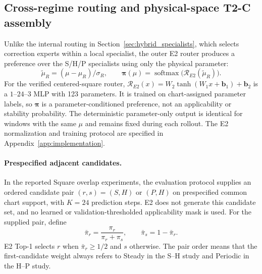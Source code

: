 \subsection{Cross-regime routing and physical-space T2-C assembly}
\label{sec:outer_routing}

Unlike the internal routing in Section~\ref{sec:hybrid_specialists},
which selects correction experts within a local specialist, the outer
E2 router produces a preference over the S/H/P specialists using only
the physical parameter:
\begin{equation}
  \widetilde\mu_R=(\mu-\mu_R)/\sigma_R,\qquad
  \bm\pi(\mu)=\operatorname{softmax}
  \bigl(\mathcal R_{E2}(\widetilde\mu_R)\bigr).
  \label{eq:main_e2_preference}
\end{equation}
For the verified centered-square router,
$\mathcal R_{E2}(x)=W_2\tanh(W_1x+\bm b_1)+\bm b_2$
is a $1$--$24$--$3$ MLP with 123 parameters.
It is trained on chart-assigned parameter labels, so $\bm\pi$ is a
parameter-conditioned preference, not an applicability or stability
probability. The deterministic parameter-only output is identical
for windows with the same $\mu$ and remains fixed during each rollout.
The E2 normalization and training protocol are specified in
Appendix~\ref{app:implementation}.

\paragraph{Prespecified adjacent candidates.}
In the reported Square overlap experiments, the evaluation protocol
supplies an ordered candidate pair $(r,s)=(S,H)$ or $(P,H)$ on
prespecified common chart support, with $K=24$ prediction steps.
E2 does not generate this candidate set, and no learned or
validation-thresholded applicability mask is used.
For the supplied pair, define
\begin{equation}
  \bar\pi_r=\frac{\pi_r}{\pi_r+\pi_s},\qquad
  \bar\pi_s=1-\bar\pi_r.
  \label{eq:main_pair_preference}
\end{equation}
E2 Top-1 selects $r$ when $\bar\pi_r\geq1/2$ and $s$ otherwise.
The pair order means that the first-candidate weight always refers
to Steady in the S--H study and Periodic in the H--P study.

